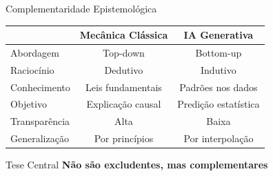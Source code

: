 \documentclass[aspectratio=169,12pt]{beamer}
\begin{document}
\begin{frame}{Complementaridade Epistemológica}
    \begin{center}
    \begin{tabular}{lcc}
        \toprule
        & \textbf{Mecânica Clássica} & \textbf{IA Generativa} \\
        \midrule
        Abordagem & Top-down & Bottom-up \\
        Raciocínio & Dedutivo & Indutivo \\
        Conhecimento & Leis fundamentais & Padrões nos dados \\
        Objetivo & Explicação causal & Predição estatística \\
        Transparência & Alta & Baixa \\
        Generalização & Por princípios & Por interpolação \\
        \bottomrule
    \end{tabular}
    \end{center}

    \vspace{0.5cm}

    \begin{alertblock}{Tese Central}
        \centering
        \textbf{Não são excludentes, mas complementares}
    \end{alertblock}
\end{frame}
\end{document}
